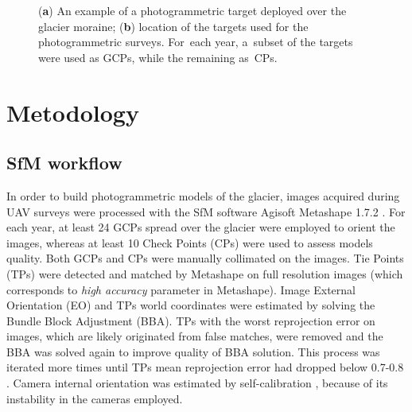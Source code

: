 \begin{figure}
    \centering
	\caption{(\textbf{a}) An example of a photogrammetric target deployed over the glacier moraine; (\textbf{b}) location of the targets used for the photogrammetric surveys. For~each year, a~subset of the targets were used as GCPs, while the remaining as~CPs.}
	\label{fig:belvedereGCP}	
\end{figure}


\section{Metodology}

\subsection{SfM workflow}

In order to build photogrammetric models of the glacier, images acquired during UAV surveys were processed with the SfM software Agisoft Metashape 1.7.2 \citep{agisoft}.
For each year, at least 24 GCPs spread over the glacier were employed to orient the images, whereas at least 10 Check Points (CPs) were used to assess models quality.
Both GCPs and CPs were manually collimated on the images.
Tie Points (TPs) were detected and matched by Metashape on full resolution images (which corresponds to \textit{high accuracy} parameter in Metashape). 
Image External Orientation (EO) and TPs world coordinates were estimated by solving the Bundle Block Adjustment (BBA). 
TPs with the worst reprojection error on images, which are likely originated from false matches, were removed and the BBA was solved again to improve quality of BBA solution.
This process was iterated more times until TPs mean reprojection error had dropped below 0.7-0.8 \unit{\pixel}.
Camera internal orientation was estimated by self-calibration \citep{Fraser2013,Cramer2017}, because of its instability in the cameras employed.

